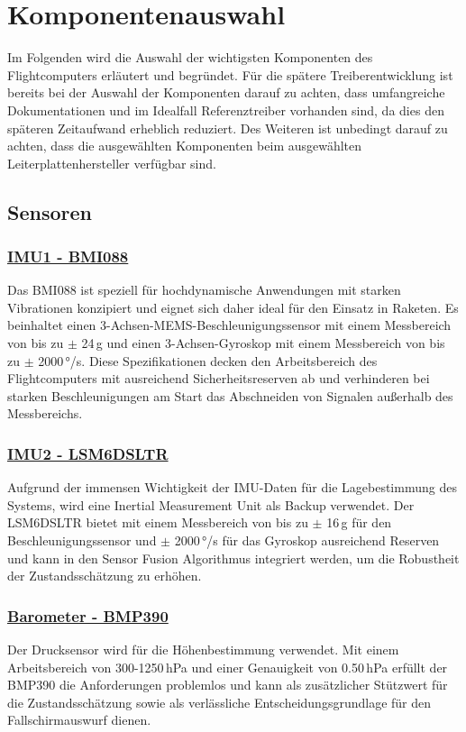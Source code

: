 \section{Komponentenauswahl}
\label{sec:komponentenauswahl}
Im Folgenden wird die Auswahl der wichtigsten Komponenten des Flightcomputers erläutert und begründet. Für die spätere Treiberentwicklung ist bereits bei der Auswahl der Komponenten darauf zu achten, dass umfangreiche Dokumentationen und im Idealfall Referenztreiber vorhanden sind, da dies den späteren Zeitaufwand erheblich reduziert. Des Weiteren ist unbedingt darauf zu achten, dass die ausgewählten Komponenten beim ausgewählten Leiterplattenhersteller verfügbar sind.

\subsection{Sensoren}
\label{subsec:sensoren}
\subsubsection{\href{https://www.bosch-sensortec.com/products/motion-sensors/imus/bmi088/}{IMU1 - BMI088}}
Das BMI088 ist speziell für hochdynamische Anwendungen mit starken Vibrationen konzipiert und eignet sich daher ideal für den Einsatz in Raketen. Es beinhaltet einen 3-Achsen-MEMS-Beschleunigungssensor mit einem Messbereich von bis zu $\pm$ 24\,g und einen 3-Achsen-Gyroskop mit einem Messbereich von bis zu $\pm$ 2000\,°/s. Diese Spezifikationen decken den Arbeitsbereich des Flightcomputers mit ausreichend Sicherheitsreserven ab und verhinderen bei starken Beschleunigungen am Start das Abschneiden von Signalen außerhalb des Messbereichs.

\subsubsection{\href{https://www.st.com/en/mems-and-sensors/lsm6dsl.html}{IMU2 - LSM6DSLTR}}
Aufgrund der immensen Wichtigkeit der IMU-Daten für die Lagebestimmung des Systems, wird eine Inertial Measurement Unit als Backup verwendet. Der LSM6DSLTR bietet mit einem Messbereich von bis zu $\pm$ 16\,g für den Beschleunigungssensor und $\pm$ 2000\,°/s für das Gyroskop ausreichend Reserven und kann in den Sensor Fusion Algorithmus integriert werden, um die Robustheit der Zustandsschätzung zu erhöhen.
\subsubsection{\href{https://www.bosch-sensortec.com/products/environmental-sensors/pressure-sensors/bmp390/}{Barometer - BMP390}}
Der Drucksensor wird für die Höhenbestimmung verwendet. Mit einem Arbeitsbereich von 300-1250\,hPa und einer Genauigkeit von 0.50\,hPa erfüllt der BMP390 die Anforderungen problemlos und kann als zusätzlicher Stützwert für die Zustandsschätzung sowie als verlässliche Entscheidungsgrundlage für den Fallschirmauswurf dienen.
